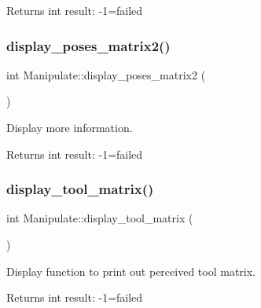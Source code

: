 \begin{DoxyReturn}{Returns}
int result\+: -\/1=failed 
\end{DoxyReturn}
\mbox{\label{structManipulate_aff548e55e9bbfb49459a8b9b419b4dbe}} 
\subsubsection{\texorpdfstring{display\+\_\+poses\+\_\+matrix2()}{display\_poses\_matrix2()}}
{\footnotesize\ttfamily int Manipulate\+::display\+\_\+poses\+\_\+matrix2 (\begin{DoxyParamCaption}{ }\end{DoxyParamCaption})\hspace{0.3cm}{\ttfamily [private]}}



Display more information. 

\begin{DoxyReturn}{Returns}
int result\+: -\/1=failed 
\end{DoxyReturn}
\mbox{\label{structManipulate_a4933228a7e9745630d8a4e529bdc2e98}} 
\subsubsection{\texorpdfstring{display\+\_\+tool\+\_\+matrix()}{display\_tool\_matrix()}}
{\footnotesize\ttfamily int Manipulate\+::display\+\_\+tool\+\_\+matrix (\begin{DoxyParamCaption}{ }\end{DoxyParamCaption})\hspace{0.3cm}{\ttfamily [private]}}



Display function to print out perceived tool matrix. 

\begin{DoxyReturn}{Returns}
int result\+: -\/1=failed 
\end{DoxyReturn}
\mbox{\label{structManipulate_a159148c2a60da01c497c2a4fe4e76e42}} 
